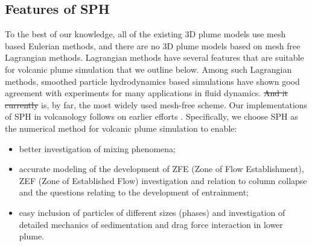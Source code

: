 \documentclass[gmd, manuscript]{copernicus} %
\providecommand{\DIFadd}[1]{{\protect\color{blue}\uwave{#1}}} %
\providecommand{\DIFdel}[1]{{\protect\color{red}\sout{#1}}}                      %
\providecommand{\DIFaddbegin}{} %
\providecommand{\DIFaddend}{} %
\providecommand{\DIFdelbegin}{} %
\providecommand{\DIFdelend}{} %
\begin{document}
\subsection{Features of SPH}
To the best of our knowledge, all of the existing 3D plume models use mesh based Eulerian methods, and there are no 3D plume models based on mesh free Lagrangian methods. Lagrangian methods have several features that are suitable for volcanic plume simulation that we outline below. Among such Lagrangian methods, smoothed particle hydrodynamics \citep{gingold1977smoothed,lucy1977numerical} based simulations have shown good agreement with experiments for many applications in fluid dynamics. \DIFdelbegin \DIFdel{And it currently }\DIFdelend \DIFaddbegin \DIFadd{Currently it }\DIFaddend is, by far, the most widely used mesh-free scheme. Our implementations of SPH in volcanology follows on earlier efforts   \citep{bursik2003smoothed,herault2010sph,haddad2016smoothed}.
Specifically, we choose SPH as the numerical method for volcanic plume simulation to enable:
\begin{itemize}
\item better investigation of mixing phenomena;
\item accurate modeling of the development of ZFE (Zone of Flow Establishment), ZEF (Zone of Established Flow) investigation and relation to column collapse and the questions relating to the development of entrainment;
\item  easy inclusion of particles of different sizes (phases) and investigation of detailed mechanics of sedimentation and drag force interaction in lower plume.
\end{itemize}
\DIFaddbegin 
\end{document}
